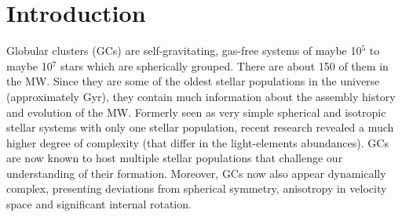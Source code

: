 

\section{Introduction}\label{Introduction}
Globular clusters (\acsp{GC}) are self-gravitating, gas-free systems of maybe 10\(^5\) to maybe 10\(^7\) stars which are spherically grouped. There are about 150 of them in the \ac{MW}. Since they are some of the oldest stellar populations in the universe (approximately \unit[13]{Gyr}), they contain much information about the assembly history and evolution of the \ac{MW}. Formerly seen as very simple spherical and isotropic stellar systems with only one stellar population, recent research revealed a much higher degree of complexity (that differ in the light-elements abundances). \acp{GC} are now known to host multiple stellar populations that challenge our understanding of their formation. Moreover, \acp{GC} now also appear dynamically complex, presenting deviations from spherical symmetry, anisotropy in velocity space and significant internal rotation.
 

